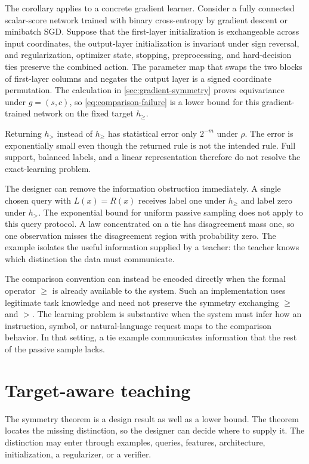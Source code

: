\documentclass[11pt,twoside]{article}
\theoremstyle{definition}
\theoremstyle{remark}
\begin{document}
The corollary applies to a concrete gradient learner. Consider a fully
connected scalar-score network trained with binary cross-entropy by gradient
descent or minibatch SGD. Suppose that the first-layer initialization is
exchangeable across input coordinates, the output-layer initialization is
invariant under sign reversal, and regularization, optimizer state, stopping,
preprocessing, and hard-decision ties preserve the combined action. The
parameter map that swaps the two blocks of first-layer columns and negates the
output layer is a signed coordinate permutation. The calculation in
\cref{sec:gradient-symmetry} proves equivariance under \(g=(s,c)\), so
\cref{eq:comparison-failure} is a lower bound for this gradient-trained
network on the fixed target \(h_{\ge}\).

Returning \(h_{>}\) instead of \(h_{\ge}\) has statistical error only
\(2^{-m}\) under \(\rho\). The error is exponentially small even though the
returned rule is not the intended rule. Full support, balanced labels, and a
linear representation therefore do not resolve the exact-learning problem.

The designer can remove the information obstruction immediately. A single
chosen query with \(L(x)=R(x)\) receives label one under \(h_{\ge}\) and label
zero under \(h_{>}\). The exponential bound for uniform passive sampling does
not apply to this query protocol. A law concentrated on a tie has disagreement
mass one, so one observation misses the disagreement region with probability
zero. The example isolates the useful information supplied by a teacher: the
teacher knows which distinction the data must communicate.

The comparison convention can instead be encoded directly when the formal
operator \(\ge\) is already available to the system. Such an implementation
uses legitimate task knowledge and need not preserve the symmetry exchanging
\(\ge\) and \(>\). The learning problem is substantive when the system must
infer how an instruction, symbol, or natural-language request maps to the
comparison behavior. In that setting, a tie example communicates information
that the rest of the passive sample lacks.

\section{Target-aware teaching}
\label{sec:teaching}

The symmetry theorem is a design result as well as a lower bound. The theorem
locates the missing distinction, so the designer can decide where to supply it. The
distinction may enter through examples, queries, features, architecture,
initialization, a regularizer, or a verifier.
\end{document}
